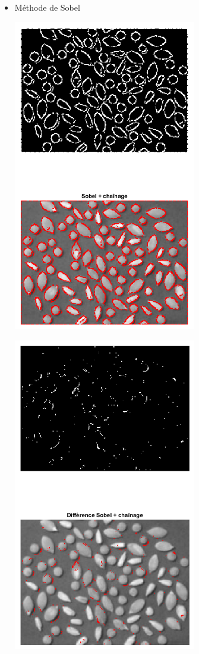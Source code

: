 \documentclass{article}
\begin{document}
\begin{itemize}[leftmargin=*]
\begin{itemize}[leftmargin=*]
		\item Méthode de Sobel
		
\begin{minipage}[c]{0.46\linewidth}		
	\includegraphics[width=8cm]{Sobel_link.png}
\end{minipage}\hfill
\begin{minipage}[c]{0.46\linewidth}
	\includegraphics[width=8cm]{Diff_Sobel_link.png}
\end{minipage}\hfill


\end{itemize}
\end{itemize}
\end{document}
